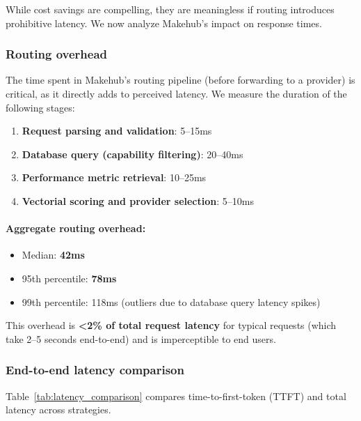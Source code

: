 \documentclass[english]{article}
\begin{document}
While cost savings are compelling, they are meaningless if routing introduces prohibitive latency. We now analyze Makehub's impact on response times.

\subsubsection{Routing overhead}

The time spent in Makehub's routing pipeline (before forwarding to a provider) is critical, as it directly adds to perceived latency. We measure the duration of the following stages:

\begin{enumerate}
\item \textbf{Request parsing and validation}: 5--15ms
\item \textbf{Database query (capability filtering)}: 20--40ms
\item \textbf{Performance metric retrieval}: 10--25ms
\item \textbf{Vectorial scoring and provider selection}: 5--10ms
\end{enumerate}

\paragraph{Aggregate routing overhead:}
\begin{itemize}
    \item Median: \textbf{42ms}
    \item 95th percentile: \textbf{78ms}
    \item 99th percentile: 118ms (outliers due to database query latency spikes)
\end{itemize}

This overhead is \textbf{<2\% of total request latency} for typical requests (which take 2--5 seconds end-to-end) and is imperceptible to end users.

\subsubsection{End-to-end latency comparison}

Table~\ref{tab:latency_comparison} compares time-to-first-token (TTFT) and total latency across strategies.
\end{document}
